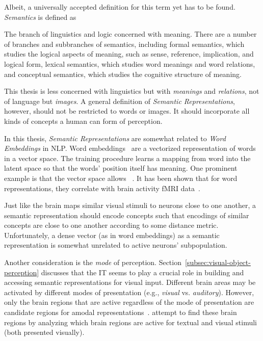 Albeit, a universally accepted definition for this term yet has to be found.
\textit{Semantics} is defined as~\citep{lexico}
\begin{displayquote}
    The branch of linguistics and logic concerned with meaning. There are a number of branches and subbranches of semantics, including formal semantics, which studies the logical aspects of meaning, such as sense, reference, implication, and logical form, lexical semantics, which studies word meanings and word relations, and conceptual semantics, which studies the cognitive structure of meaning.
\end{displayquote}
This thesis is less concerned with linguistics but with \textit{meanings} and \textit{relations}, not of language but \textit{images}.
A general definition of \textit{Semantic Representations}, however, should not be restricted to words or images.
It should incorporate all kinds of concepts a human can form of perception.

In this thesis, \textit{Semantic Representations} are somewhat related to \textit{Word Embeddings} in \ac{NLP}.
Word embeddings~\citep{mikolov2013efficient} are a vectorized representation of words in a vector space.
The training procedure learns a mapping from word into the latent space so that the words' position itself has meaning.
One prominent example is that the vector space allows ~\citep{mikolov2013efficient}.
It has been shown that for word representations, they correlate with brain activity fMRI data~\citep{ruan2016exploring, anderson2013words}.

Just like the brain maps similar visual stimuli to neurons close to one another, a semantic representation should encode concepts such that encodings of similar concepts are close to one another according to some distance metric.
Unfortunately, a dense vector (as in word embeddings) as a semantic representation is somewhat unrelated to active neurons’ subpopulation.

Another consideration is the \textit{mode} of perception.
Section~\ref{subsec:visual-object-perception} discusses that the \ac{IT} seems to play a crucial role in building and accessing semantic representations for visual input.
Different brain areas may be activated by different modes of presentation (e.g., \textit{visual} vs. \textit{auditory}).
However, only the brain regions that are active regardless of the mode of presentation are candidate regions for amodal representations~\citep{fairhall2013brain}.
\citet{fairhall2013brain} attempt to find these brain regions by analyzing which brain regions are active for textual and visual stimuli (both presented visually).

